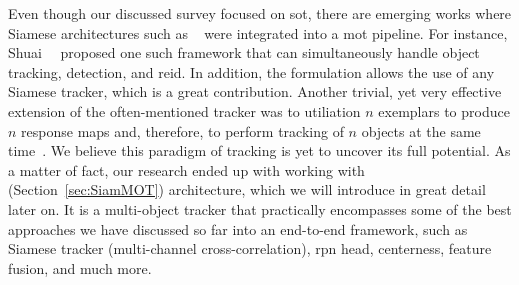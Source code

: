 Even though our discussed survey focused on \gls{sot}, there are emerging works where Siamese architectures such as \siamfc{}~\cite{bertinetto2016siamfc} were integrated into a \gls{mot} pipeline. For instance, Shuai~\etal{}~\cite{shuai2020multisiamrcnn} proposed one such framework that can simultaneously handle object tracking, detection, and \gls{reid}. In addition, the formulation allows the use of any Siamese tracker, which is a great contribution. Another trivial, yet very effective extension of the often-mentioned \siamfc{} tracker was to utiliation $n$ exemplars to produce $n$ response maps and, therefore, to perform tracking of $n$ objects at the same time~\cite{vaquero2021siammt}. We believe this paradigm of tracking is yet to uncover its full potential. As a matter of fact, our research ended up with working with \siammot{}~\cite{shuai2021siammot} (Section~\ref{sec:SiamMOT}) architecture, which we will introduce in great detail later on. It is a multi-object tracker that practically encompasses some of the best approaches we have discussed so far into an end-to-end framework, such as Siamese tracker (multi-channel cross-correlation), \gls{rpn} head, centerness, feature fusion, and much more.
